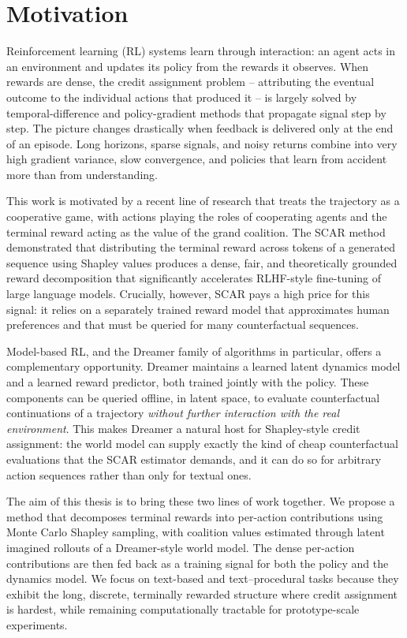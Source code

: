 \chapter*{Motivation}\label{chap:motivation}

Reinforcement learning (RL) systems learn through interaction: an agent acts in an environment and updates its policy from the rewards it observes. When rewards are dense, the credit assignment problem -- attributing the eventual outcome to the individual actions that produced it -- is largely solved by temporal-difference and policy-gradient methods that propagate signal step by step. The picture changes drastically when feedback is delivered only at the end of an episode. Long horizons, sparse signals, and noisy returns combine into very high gradient variance, slow convergence, and policies that learn from accident more than from understanding.

This work is motivated by a recent line of research that treats the trajectory as a cooperative game, with actions playing the roles of cooperating agents and the terminal reward acting as the value of the grand coalition. The SCAR method \cite{scar2025} demonstrated that distributing the terminal reward across tokens of a generated sequence using Shapley values produces a dense, fair, and theoretically grounded reward decomposition that significantly accelerates RLHF-style fine-tuning of large language models. Crucially, however, SCAR pays a high price for this signal: it relies on a separately trained reward model that approximates human preferences and that must be queried for many counterfactual sequences.

Model-based RL, and the Dreamer family of algorithms \cite{dreamer2020,dreamerv3} in particular, offers a complementary opportunity. Dreamer maintains a learned latent dynamics model and a learned reward predictor, both trained jointly with the policy. These components can be queried offline, in latent space, to evaluate counterfactual continuations of a trajectory \emph{without further interaction with the real environment}. This makes Dreamer a natural host for Shapley-style credit assignment: the world model can supply exactly the kind of cheap counterfactual evaluations that the SCAR estimator demands, and it can do so for arbitrary action sequences rather than only for textual ones.

The aim of this thesis is to bring these two lines of work together. We propose a method that decomposes terminal rewards into per-action contributions using Monte Carlo Shapley sampling, with coalition values estimated through latent imagined rollouts of a Dreamer-style world model. The dense per-action contributions are then fed back as a training signal for both the policy and the dynamics model. We focus on text-based and text--procedural tasks because they exhibit the long, discrete, terminally rewarded structure where credit assignment is hardest, while remaining computationally tractable for prototype-scale experiments.